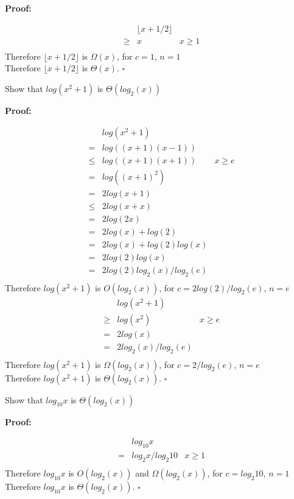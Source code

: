 \documentclass{article}
\newenvironment{proof}
{\color{PineGreen}\begin{list}{}%
         {\setlength{\leftmargin}{1cm}}%
         \item[]%
        \textbf{Proof:}
        
        }
{ $\square$\end{list}}
\begin{document}
\begin{enumerate}[label=\alph{enumi})]
\begin{proof}
\[\begin{array}{rclr}
&&\lfloor x + 1/2 \rfloor&\\
&\geq& x	&	x\geq 1\\
\end{array}\]
Therefore $\lfloor x + 1/2 \rfloor$ is $\Omega(x)$, for $c=1$, $n=1$\\
Therefore $\lfloor x + 1/2 \rfloor$ is $\Theta (x)$.
\end{proof}
\item Show that $log(x^2+1)$ is $\Theta (log_2(x))$
\begin{proof}
\[\begin{array}{rclr}
&&log(x^2+1)&\\
&=&log((x+1)(x-1))	&		\\
&\leq&log((x+1)(x+1))&	x \geq e	\\
&=&log((x+1)^2)&		\\
&=&2log(x+1)&		\\
&\leq&2log(x+x)&		\\
&=&2log(2x)&		\\
&=&2log(x) + log(2)&		\\
&=&2log(x) + log(2)log(x)&		\\
&=&2log(2)log(x)&		\\
&=&2log(2)log_2(x)/log_2(e)&		\\
\end{array}\]
Therefore $log(x^2+1)$ is $O(log_2(x))$, for $c=2log(2)/log_2(e)$, $n=e$
\[\begin{array}{rclr}
&&log(x^2+1)&\\
&\geq& log(x^2)	&	x\geq e\\
&=& 2log(x)	&	\\
&=& 2log_2(x)/log_2(e)	&	\\
\end{array}\]
Therefore $log(x^2+1)$ is $\Omega(log_2(x))$, for $c=2/log_2(e)$, $n=e$\\
Therefore $log(x^2+1)$ is $\Theta (log_2(x))$.
\end{proof}
\item Show that $log_{10}x$ is $\Theta (log_2(x))$
\begin{proof}
\[\begin{array}{rclr}
&&log_{10}x&\\
&=&log_{2}x/log_{2}10	&	x \geq 1	\\
\end{array}\]
Therefore $log_{10}x$ is $O(log_2(x))$ and $\Omega(log_2(x))$, for $c=log_{2}10$, $n=1$
Therefore $log_{10}x$ is $\Theta (log_2(x))$.
\end{proof}
\end{enumerate}
\end{document}
